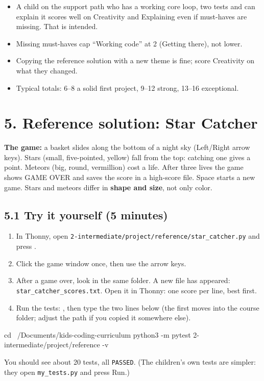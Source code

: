 \documentclass[level=2,teacher]{kidscode}
\begin{document}
\begin{teachernote}
\begin{itemize}[itemsep=1pt]
  \item A child on the support path who has a working core loop, two tests and can explain it scores
        well on Creativity and Explaining even if must-haves are missing. That is intended.
  \item Missing must-haves cap \enquote{Working code} at 2 (Getting there), not lower.
  \item Copying the reference solution with a new theme is fine; score Creativity on what they changed.
  \item Typical totals: 6--8 a solid first project, 9--12 strong, 13--16 exceptional.
\end{itemize}
\end{teachernote}

\section{5. Reference solution: Star Catcher}
\textbf{The game:} a basket slides along the bottom of a night sky (Left/Right arrow keys). Stars
(small, five-pointed, yellow) fall from the top: catching one gives a point. Meteors (big, round,
vermillion) cost a life. After three lives the game shows GAME OVER and saves the score in a
high-score file. Space starts a new game. Stars and meteors differ in \textbf{shape and size}, not only
color.

\subsection{5.1 Try it yourself (5 minutes)}
\begin{enumerate}[itemsep=1pt]
  \item In Thonny, open \texttt{2-intermediate/project/reference/star\_catcher.py}
        and press .
  \item Click the game window once, then use the arrow keys.
  \item After a game over, look in the same folder. A new file has appeared:
        \texttt{star\_catcher\_scores.txt}. Open it in Thonny: one score per line, best first.
  \item Run the tests: , then type the two lines below (the first
        moves into the course folder; adjust the path if you copied it somewhere else).
\end{enumerate}
\begin{shellcode}
cd ~/Documents/kids-coding-curriculum
python3 -m pytest 2-intermediate/project/reference -v
\end{shellcode}
You should see about 20 tests, all \texttt{PASSED}. (The children's own tests are simpler: they open
\texttt{my\_tests.py} and press Run.)
\end{document}
